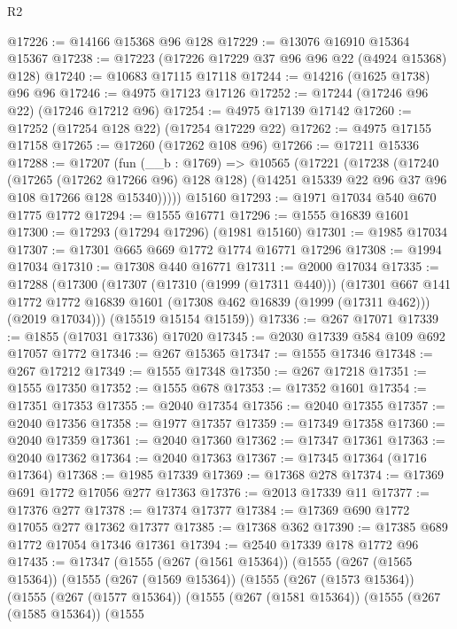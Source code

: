 \begin{lexlean}{R2}
\begin{coremodule}
@17226 := @14166 @15368 @96 @128
@17229 := @13076 @16910 @15364 @15367
@17238 := @17223 (@17226 @17229 @37 @96 @96 @22 (@4924 @15368) @128)
@17240 := @10683 @17115 @17118
@17244 := @14216 (@1625 @1738) @96 @96
@17246 := @4975 @17123 @17126
@17252 := @17244 (@17246 @96 @22) (@17246 @17212 @96)
@17254 := @4975 @17139 @17142
@17260 := @17252 (@17254 @128 @22) (@17254 @17229 @22)
@17262 := @4975 @17155 @17158
@17265 := @17260 (@17262 @108 @96)
@17266 := @17211 @15336
@17288 := @17207
    (fun (__b : @1769) =>
    @10565
      (@17221
        (@17238
          (@17240
            (@17265 (@17262 @17266 @96) @128 @128)
            (@14251 @15339 @22 @96 @37 @96 @108 @17266 @128 @15340)))))
    @15160
@17293 := @1971 @17034 @540 @670 @1775 @1772
@17294 := @1555 @16771
@17296 := @1555 @16839 @1601
@17300 := @17293 (@17294 @17296) (@1981 @15160)
@17301 := @1985 @17034
@17307 := @17301 @665 @669 @1772 @1774 @16771 @17296
@17308 := @1994 @17034
@17310 := @17308 @440 @16771
@17311 := @2000 @17034
@17335 := @17288
    (@17300
      (@17307
        (@17310 (@1999 (@17311 @440)))
        (@17301
          @667
          @141
          @1772
          @1772
          @16839
          @1601
          (@17308 @462 @16839 (@1999 (@17311 @462)))
          (@2019 @17034)))
      (@15519 @15154 @15159))
@17336 := @267 @17071
@17339 := @1855 (@17031 @17336) @17020
@17345 := @2030 @17339 @584 @109 @692 @17057 @1772
@17346 := @267 @15365
@17347 := @1555 @17346
@17348 := @267 @17212
@17349 := @1555 @17348
@17350 := @267 @17218
@17351 := @1555 @17350
@17352 := @1555 @678
@17353 := @17352 @1601
@17354 := @17351 @17353
@17355 := @2040 @17354
@17356 := @2040 @17355
@17357 := @2040 @17356
@17358 := @1977 @17357
@17359 := @17349 @17358
@17360 := @2040 @17359
@17361 := @2040 @17360
@17362 := @17347 @17361
@17363 := @2040 @17362
@17364 := @2040 @17363
@17367 := @17345 @17364 (@1716 @17364)
@17368 := @1985 @17339
@17369 := @17368 @278
@17374 := @17369 @691 @1772 @17056 @277 @17363
@17376 := @2013 @17339 @11
@17377 := @17376 @277
@17378 := @17374 @17377
@17384 := @17369 @690 @1772 @17055 @277 @17362 @17377
@17385 := @17368 @362
@17390 := @17385 @689 @1772 @17054 @17346 @17361
@17394 := @2540 @17339 @178 @1772 @96
@17435 := @17347
    (@1555
      (@267 (@1561 @15364))
      (@1555
        (@267 (@1565 @15364))
        (@1555
          (@267 (@1569 @15364))
          (@1555
            (@267 (@1573 @15364))
            (@1555
              (@267 (@1577 @15364))
              (@1555
                (@267 (@1581 @15364))
                (@1555
                  (@267 (@1585 @15364))
                  (@1555

\end{coremodule}
\end{lexlean}
